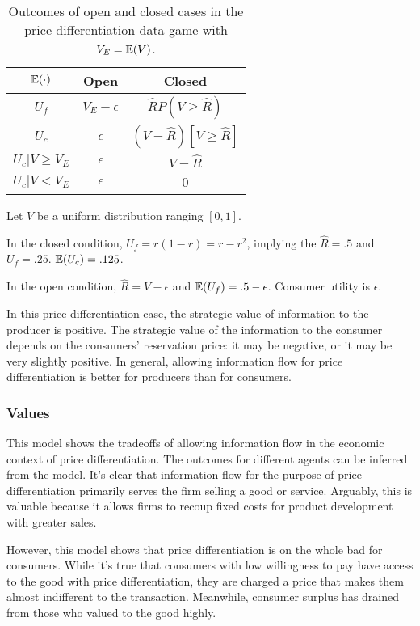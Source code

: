 \documentclass[../thesis.tex]{subfiles}
\begin{document}
\begin{table}
\begin{center}
\begin{tabular}{ |c|c|c| } 
 \hline
  $\mathbb{E}(\cdot)$ & Open & Closed  \\
 \hline
 $U_f$ & $V_E - \epsilon$ & $\hat{R} P(V \geq \hat{R})$ \\ 
 $U_c$ & $\epsilon$ & $(V - \hat{R}) [V \geq \hat{R}]$  \\
 $U_c \vert V \geq V_E$ & $\epsilon$ & $V - \hat{R}$  \\
 $U_c \vert V < V_E$ & $\epsilon$ & 0  \\
 \hline
\end{tabular}
\end{center}
\caption{Outcomes of open and closed cases in the price differentiation data game with $V_E = \mathbb{E}(V)$.}
\end{table}

\begin{exm}
  Let $V$ be a uniform distribution ranging $[0,1]$.
  
  In the closed condition, $U_f = r (1 - r) = r - r^2$,
  implying the $\hat{R} = .5$ and $U_f = .25$.
  $\mathbb{E}(U_c) = .125$.

  In the open condition, $\hat{R} = V - \epsilon$
  and $\mathbb{E}(U_f) = .5 - \epsilon$.
  Consumer utility is $\epsilon$.
\end{exm}

In this price differentiation case, the strategic
value of information to the producer is positive.
The strategic value of the information to the consumer
depends on the consumers' reservation price: it may
be negative, or it may be very slightly positive.
In general, allowing information flow for price
differentiation is better for producers than for
consumers.

\subsubsection{Values}

This model shows the tradeoffs of allowing information
flow in the economic context of price differentiation.
The outcomes for different agents can be inferred from
the model.
It's clear that information flow for the purpose of
price differentiation primarily serves the firm
selling a good or service.
Arguably, this is valuable because it allows firms
to recoup fixed costs for product development with
greater sales.

However, this model shows that price differentiation
is on the whole bad for consumers.
While it's true that consumers with low willingness
to pay have access to the good with price differentiation,
they are charged a price that makes them almost
indifferent to the transaction.
Meanwhile, consumer surplus has drained from those
who valued to the good highly.
\end{document}
